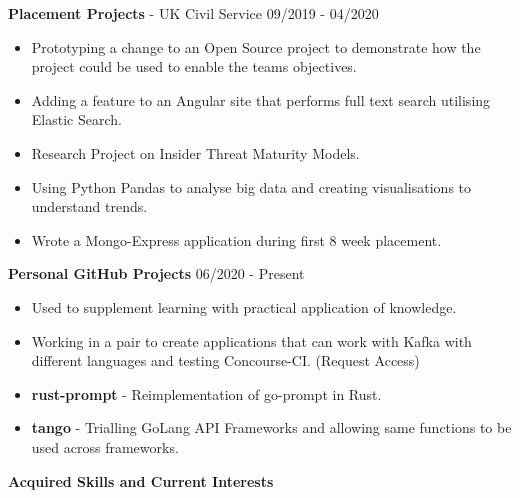 \documentclass{article}
\begin{document}
\textbf{Placement Projects} - UK Civil Service \hfill 09/2019 - 04/2020

\begin{multicols}{2}
\begin{itemize}
\itemsep0em
	\item Prototyping a change to an Open Source project to demonstrate how the project could be used to enable the teams objectives.
	\item Adding a feature to an Angular site that performs full text search utilising Elastic Search.
	\item Research Project on Insider Threat Maturity Models.
	\item Using Python Pandas to analyse big data and creating visualisations to understand trends.
	\item Wrote a Mongo-Express application during first 8 week placement.
\end{itemize}
\end{multicols}

\textbf{Personal GitHub Projects} \hfill 06/2020 - Present

\begin{multicols}{2}
\begin{itemize}
\itemsep0em
	\item Used to supplement learning with practical application of knowledge.
	\item Working in a pair to create applications that can work with Kafka with different languages and testing Concourse-CI. (Request Access)
	\item \textbf{rust-prompt} - Reimplementation of go-prompt in Rust.
	\item \textbf{tango} - Trialling GoLang API Frameworks and allowing same functions to be used across frameworks.
\end{itemize}
\end{multicols}

\textbf{Acquired Skills and Current Interests}
\end{document}
